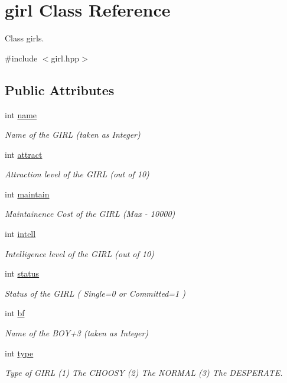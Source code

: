 \hypertarget{classgirl}{\section{girl Class Reference}
\label{classgirl}
}


Class girls.  




{\ttfamily \#include $<$girl.\-hpp$>$}

\subsection*{Public Attributes}
\begin{DoxyCompactItemize}
\item 
int \hyperlink{classgirl_a448de26f9f39423d14da2a98a1ab976b}{name}
\begin{DoxyCompactList}\small\item\em Name of the G\-I\-R\-L (taken as Integer) \end{DoxyCompactList}\item 
int \hyperlink{classgirl_ad75ed7e0a60b5d4723ceffe5df47be83}{attract}
\begin{DoxyCompactList}\small\item\em Attraction level of the G\-I\-R\-L (out of 10) \end{DoxyCompactList}\item 
int \hyperlink{classgirl_ab435cbd480a002857ae406e47dd513f3}{maintain}
\begin{DoxyCompactList}\small\item\em Maintainence Cost of the G\-I\-R\-L (Max -\/ 10000) \end{DoxyCompactList}\item 
int \hyperlink{classgirl_a8412e2e3a1a3c58bf1bbef7028bdce93}{intell}
\begin{DoxyCompactList}\small\item\em Intelligence level of the G\-I\-R\-L (out of 10) \end{DoxyCompactList}\item 
int \hyperlink{classgirl_a3c12399f01c1068062fbefb2206d5457}{status}
\begin{DoxyCompactList}\small\item\em Status of the G\-I\-R\-L ( Single=0 or Committed=1 ) \end{DoxyCompactList}\item 
int \hyperlink{classgirl_ad1ae153d6910d8ea54ee89d80d182616}{bf}
\begin{DoxyCompactList}\small\item\em Name of the B\-O\-Y+3 (taken as Integer) \end{DoxyCompactList}\item 
int \hyperlink{classgirl_a8e02617b5ea362f8c1311713de02f977}{type}
\begin{DoxyCompactList}\small\item\em Type of G\-I\-R\-L (1) The C\-H\-O\-O\-S\-Y (2) The N\-O\-R\-M\-A\-L (3) The D\-E\-S\-P\-E\-R\-A\-T\-E. \end{DoxyCompactList}\end{DoxyCompactItemize}


